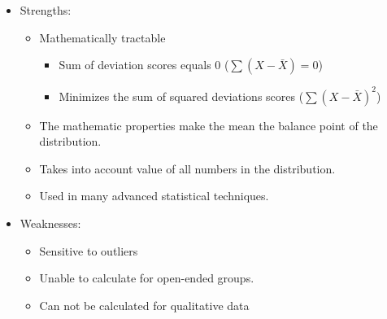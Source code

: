 \documentclass[12pt]{article}
\begin{document}
\begin{itemize}
\itemsep1pt\parskip0pt
\item
  Strengths:

  \begin{itemize}
  \itemsep1pt\parskip0pt
  \item
    Mathematically tractable

    \begin{itemize}
    \itemsep1pt\parskip0pt
    \item
      Sum of deviation scores equals 0 (\(\sum(X - \bar{X}) = 0\))
    \item
      Minimizes the sum of squared deviations scores
      (\(\sum(X - \bar{X})^2\))
    \end{itemize}
  \item
    The mathematic properties make the mean the balance point of the
    distribution.
  \item
    Takes into account value of all numbers in the distribution.
  \item
    Used in many advanced statistical techniques.
  \end{itemize}
\item
  Weaknesses:

  \begin{itemize}
  \itemsep1pt\parskip0pt
  \item
    Sensitive to outliers
  \item
    Unable to calculate for open-ended groups.
  \item
    Can not be calculated for qualitative data
  \end{itemize}
\end{itemize}
\end{document}
